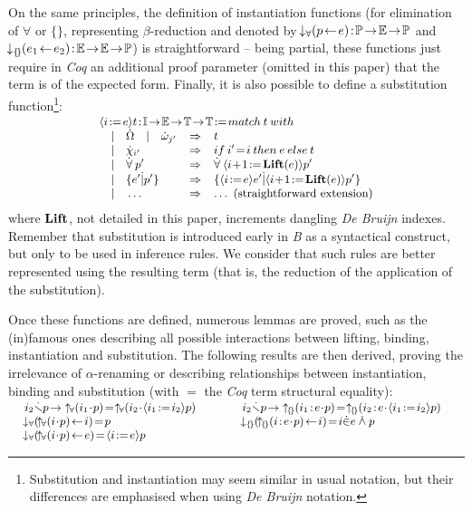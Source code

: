 \documentclass{llncs}
\begin{document}
On the same principles, the definition of instantiation functions (for elimination of 
$\forall$ or $\{\}$, representing $\beta$-reduction and denoted by 
$\Binfor{e}{p}\!:\!\Bprd\!\to\!\Bexp\!\to\!\Bprd$ and
$\Bincmp{e_2}{e_1}\!:\!\Bexp\!\to\!\Bexp\!\to\!\Bprd$) is straightforward -- being partial,
these functions just require in \emph{Coq} an additional proof parameter (omitted in this 
paper) that the term is of the expected form. Finally, it is also possible to define a 
substitution function\footnote{Substitution and instantiation may seem similar in usual 
notation, but their differences are emphasised when using \emph{De Bruijn} notation.}:
\[
\small
\begin{array}{lcl}
\vspace{-16pt}\\
\multicolumn{3}{l}
{\Baffec{i}{e}{t}\!:\!\Bidx\!\to\!\Bexp\!\to\!\Btrm\!\to\!\Btrm\!:=\!match\:t\:with}\\
\quad | \quad \ebig\quad|\quad\ebie{j'} & \Rightarrow & t\\
\quad | \quad \evar{i'} & \Rightarrow & if\:i'\!=\!i\:then\:e\:else\:t\\
\quad | \quad \pfor p' & \Rightarrow & \pfor \Baffec{i\!+\!1}{\Bcmd{Lift}(e)}{p'}\\
\quad | \quad \ecmp{e'}{p'} & \Rightarrow & \ecmp{\Baffec{i}{e}{e'}}
                                               {\Baffec{i\!+\!1}{\Bcmd{Lift}(e)}{p'}}\\
\quad | \quad \ldots & \Rightarrow & \ldots \text{ (straightforward extension)}\\
\end{array}
\]
where $\mathbf{Lift}$, not detailed in this paper, increments dangling \emph{De Bruijn} indexes.
Remember that substitution is introduced early in \emph{B} as a syntactical construct, but 
only to be used in inference rules. We consider that such rules are better represented using 
the resulting term (that is, the reduction of the application of the substitution).

Once these functions are defined, numerous lemmas are proved, such as the (in)famous ones 
describing all possible interactions between lifting, binding, instantiation and substitution.
The following results are then derived, proving the irrelevance of $\alpha$-renaming or 
describing relationships between instantiation, binding and substitution (with $=$ the 
\emph{Coq} term structural equality):
\[
\small
\begin{array}{ll}
\rule{5.7cm}{0pt} & \rule{5.7cm}{0pt} \vspace{-16pt} \\
i_2 \Bnotfree p\!\to\:\:
\Bbdfor{i_1}{p}\!=\:\Bbdfor{i_2}{\Baffec{i_1}{i_2}{p}}
&
i_2 \Bnotfree p\!\to\:
 \:\Bbdcmp{i_1}{e}{p}\!=\:\Bbdcmp{i_2}{e}{\Baffec{i_1}{i_2}{p}}\\
\Binfor{i}{\Bbdfor{i}{p}}\!=\!p
&
\Bincmp{i}{\Bbdcmp{i}{e}{p}}\!=\!i\pins e\:\pand\:p\\
\Binfor{e}{\Bbdfor{i}{p}}\!=\!\Baffec{i}{e}{p}\\
\end{array}
\]
\end{document}
